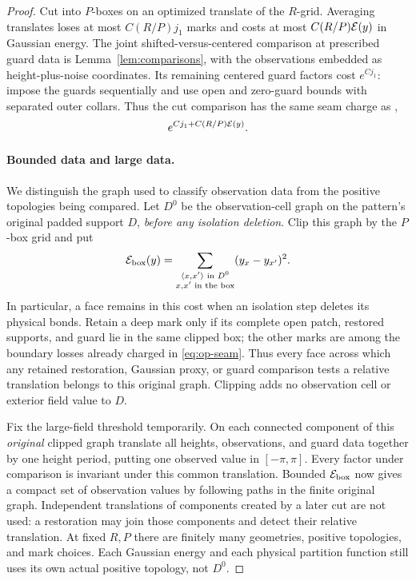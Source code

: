 \begin{proof}
Cut into \(P\)-boxes on an optimized translate of the
\(R\)-grid.  Averaging translates loses at most
\(C(R/P)j_1\) marks and costs at most
\(C(R/P){\cal E}(y)\) in Gaussian energy.  The joint
shifted-versus-centered comparison at prescribed guard
data is Lemma~\ref{lem:comparisons}, with the observations
embedded as height-plus-noise coordinates.  Its remaining
centered guard factors cost \(e^{Cj_1}\): impose the
guards sequentially and use open and zero-guard bounds
with separated outer collars.  Thus the cut comparison
has the same seam charge as ,
\begin{equation}\label{eq:op-seam}
                        e^{Cj_1+C(R/P){\cal E}(y)}.
\end{equation}

\paragraph{Bounded data and large data.}
We distinguish the graph used to classify observation data
from the positive topologies being compared.  Let \(D^0\)
be the observation-cell graph on the pattern's original padded
support \(D\), \emph{before any isolation deletion}.  Clip this
graph by the \(P\)-box grid and put
\begin{equation}\label{eq:op-original-face-cost}
 {\cal E}_{\rm box}(y)
 =\sum_{\substack{\langle x,x'\rangle\text{ in }D^0\\
                         x,x'\text{ in the box}}}
                                  (y_x-y_{x'})^2.
\end{equation}
In particular, a face remains in this cost when an isolation
step deletes its physical bonds.  Retain a deep mark only if
its complete open patch, restored supports, and guard lie in
the same clipped box; the other marks are among the boundary
losses already charged in \eqref{eq:op-seam}.  Thus every face
across which any retained restoration, Gaussian proxy, or
guard comparison tests a relative translation belongs to this
original graph.  Clipping adds no observation cell or exterior
field value to \(D\).

Fix the large-field threshold temporarily.  On each connected
component of this \emph{original} clipped graph translate all
heights, observations, and guard data together by one height
period, putting one observed value in \([-\pi,\pi]\).  Every
factor under comparison is invariant under this common
translation.  Bounded \({\cal E}_{\rm box}\) now gives a
compact set of observation values by following paths in the
finite original graph.  Independent translations of components
created by a later cut are not used: a restoration may join
those components and detect their relative translation.  At
fixed \(R,P\) there are finitely many geometries, positive
topologies, and mark choices.  Each Gaussian energy and each
physical partition function still uses its own actual positive
topology, not \(D^0\).


\end{proof}
